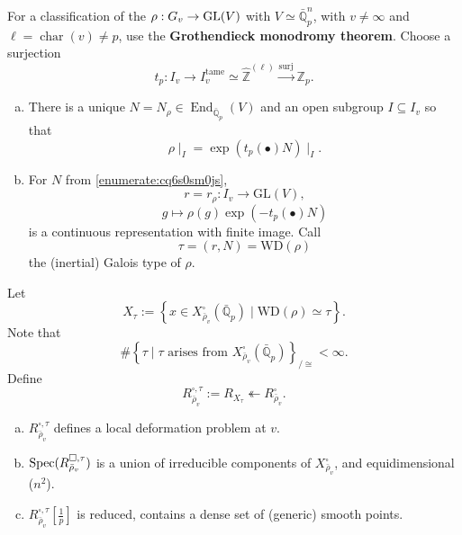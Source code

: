 \documentclass[reqno]{amsart} 
\numberwithin{theorem}{section}
\numberwithin{equation}{section}
\numberwithin{exercise}{section}
\begin{document}
For a classification of the $\rho : G_v \rightarrow \operatorname{GL}(V)$ with $V \simeq \bar{\mathbb{Q}}_p^n$, with $v \neq \infty$ and $\ell = \operatorname{char}(v) \neq p$, use the \textbf{Grothendieck monodromy theorem}.  Choose a surjection
\begin{equation*}
  t_p : I_v \rightarrow I_v^{\mathrm{tame}} \simeq \hat{\mathbb{Z}}^{(\ell)} \xrightarrow{\text{surj}} \mathbb{Z}_p.
\end{equation*}
\begin{enumerate}[(a)]
\item\label{enumerate:cq6s0sm0js} There is a unique $N = N_\rho \in \operatorname{End}_{\bar{\mathbb{Q}}_p}(V)$ and an open subgroup $I \subseteq I_v$ so that
  \begin{equation*}
    \rho \mid_I = \exp \left(
      t_p(\bullet) N
    \right) \mid_I.
  \end{equation*}
\item\label{enumerate:cq6s0sm7x5} For $N$ from \eqref{enumerate:cq6s0sm0js},
  \begin{equation*}
    r = r_\rho : I_v \rightarrow \mathrm{GL}(V),
  \end{equation*}
  \begin{equation*}
    g \mapsto \rho(g) \exp(- t_p(\bullet) N)
  \end{equation*}
  is a continuous representation with finite image.  Call
  \begin{equation*}
    \tau =(r, N) = \mathrm{W D}(\rho)
  \end{equation*}
  the (inertial) Galois type  of $\rho$.
\end{enumerate}
Let
\begin{equation*}
  X_\tau := \left\{ x \in X_{\bar{\rho}_v}^{\square}(\bar{\mathbb{Q}}_p) \mid \mathrm{WD}(\rho) \simeq \tau \right\}.
\end{equation*}
Note that
\begin{equation*}
  \# \left\{ \tau \mid \tau \text{ arises from } X_{\bar{\rho}_v}^{\square}(\bar{\mathbb{Q}}_p) \right\}_{/ \cong} 
  < \infty.
\end{equation*}
Define
\begin{equation*}
  R_{\bar{\rho}_v}^{\square, \tau} := R_{X_\tau} \twoheadleftarrow R_{\bar{\rho}_v}^{\square}.
\end{equation*}
\begin{theorem}\label{theorem:cq6thpcsuh}
  \begin{enumerate}[(a)]
  \item\label{enumerate:cq6s0szq5l} $R_{\bar{\rho}_v}^{\square, \tau}$ defines a local deformation problem at $v$.
  \item\label{enumerate:cq6s0szrtp} $\operatorname{Spec}(R_{\bar{\rho}_v}^{\square, \tau})$ is a union of irreducible components of $X_{\bar{\rho}_v}^{\square}$, and equidimensional ($n^2$).
  \item\label{enumerate:cq6s0s13y6} $R_{\bar{\rho}_v}^{\square, \tau}[\tfrac{1}{p}]$ is reduced, contains a dense set of (generic) smooth points.
  \end{enumerate}
\end{theorem}
\end{document}
